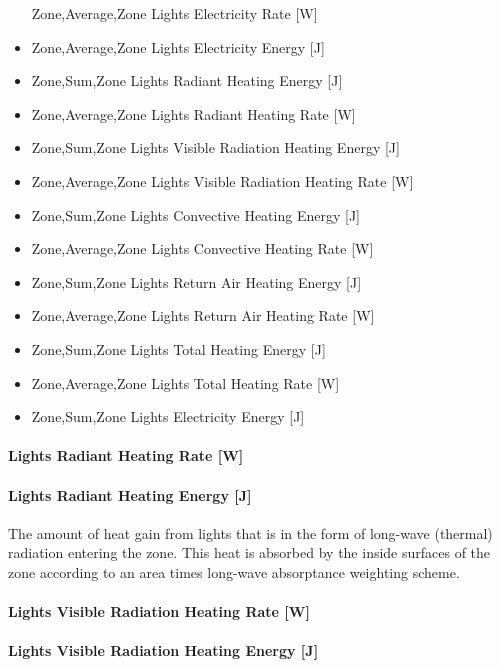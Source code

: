 \begin{itemize}
  Zone,Average,Zone Lights Electricity Rate {[}W{]}
\item
  Zone,Average,Zone Lights Electricity Energy {[}J{]}
\item
  Zone,Sum,Zone Lights Radiant Heating Energy {[}J{]}
\item
  Zone,Average,Zone Lights Radiant Heating Rate {[}W{]}
\item
  Zone,Sum,Zone Lights Visible Radiation Heating Energy {[}J{]}
\item
  Zone,Average,Zone Lights Visible Radiation Heating Rate {[}W{]}
\item
  Zone,Sum,Zone Lights Convective Heating Energy {[}J{]}
\item
  Zone,Average,Zone Lights Convective Heating Rate {[}W{]}
\item
  Zone,Sum,Zone Lights Return Air Heating Energy {[}J{]}
\item
  Zone,Average,Zone Lights Return Air Heating Rate {[}W{]}
\item
  Zone,Sum,Zone Lights Total Heating Energy {[}J{]}
\item
  Zone,Average,Zone Lights Total Heating Rate {[}W{]}
\item
  Zone,Sum,Zone Lights Electricity Energy {[}J{]}
\end{itemize}

\paragraph{Lights Radiant Heating Rate {[}W{]}}\label{lights-radiant-heating-rate-w}

\paragraph{Lights Radiant Heating Energy {[}J{]}}\label{lights-radiant-heating-energy-j}

The amount of heat gain from lights that is in the form of long-wave (thermal) radiation entering the zone. This heat is absorbed by the inside surfaces of the zone according to an area times long-wave absorptance weighting scheme.

\paragraph{Lights Visible Radiation Heating Rate {[}W{]}}\label{lights-visible-radiation-heating-rate-w}

\paragraph{Lights Visible Radiation Heating Energy {[}J{]}}\label{lights-visible-radiation-heating-energy-j}

